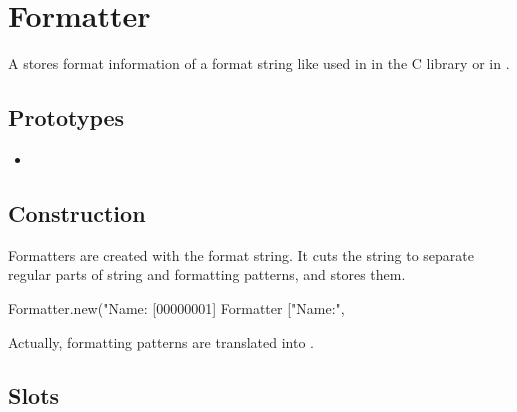 \section{Formatter}

A  stores format information of a format string like
used in  in the C library or in .

\subsection{Prototypes}

\begin{itemize}
\item {}
\end{itemize}

\subsection{Construction}

Formatters are created with the format string. It cuts the string to
separate regular parts of string and formatting patterns, and stores
them.

\begin{urbiscript}[firstnumber=1]
Formatter.new("Name:%
[00000001] Formatter ["Name:", %
\end{urbiscript}

Actually, formatting patterns are translated into
.

\subsection{Slots}

